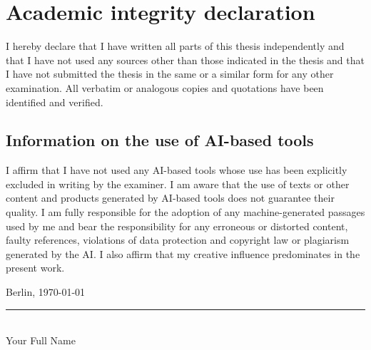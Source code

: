 \documentclass[oneside,12pt]{book}
\begin{document}
\chapter*{Academic integrity declaration}

I hereby declare that I have written all parts of this thesis independently and that I have not used any sources other than those indicated in the thesis and that I have not submitted the thesis in the same or a similar form for any other examination. All verbatim or analogous copies and quotations have been identified and verified.

\section*{Information on the use of AI-based tools}

I affirm that I have not used any AI-based tools whose use has been explicitly excluded in writing by the examiner. I am aware that the use of texts or other content and products generated by AI-based tools does not guarantee their quality. I am fully responsible for the adoption of any machine-generated passages used by me and bear the responsibility for any erroneous or distorted content, faulty references, violations of data protection and copyright law or plagiarism generated by the AI. I also affirm that my creative influence predominates in the present work.


\vspace{2cm}
\noindent Berlin, \today

\vspace{1.5cm}
\noindent\rule{6cm}{0.4pt}\\
Your Full Name
\end{document}
